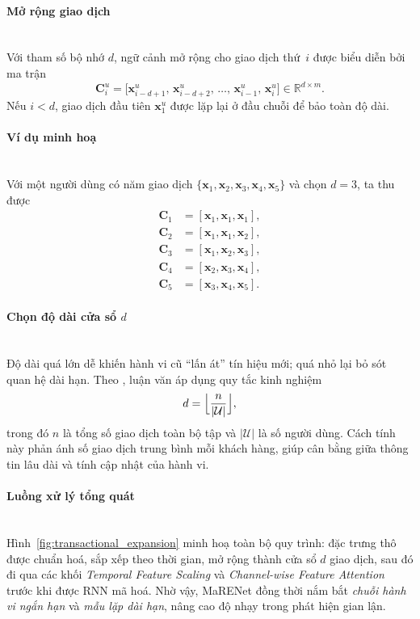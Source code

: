 \paragraph{Mở rộng giao dịch}
\mbox{}\\
Với tham số bộ nhớ $d$, ngữ cảnh mở rộng cho giao dịch thứ~$i$ được biểu diễn
bởi ma trận
\[
\mathbf{C}_i^u=\bigl[\mathbf{x}_{i-d+1}^u,\,
                      \mathbf{x}_{i-d+2}^u,\,
                      \dots,\,
                      \mathbf{x}_{i-1}^u,\,
                      \mathbf{x}_i^u\bigr]\in\mathbb{R}^{d\times m}.
\]
Nếu $i<d$, giao dịch đầu tiên $\mathbf{x}_1^u$ được lặp lại ở đầu chuỗi để bảo
toàn độ dài.

\paragraph{Ví dụ minh hoạ}
\mbox{}\\
Với một người dùng có năm giao dịch
$\{\mathbf{x}_1,\mathbf{x}_2,\mathbf{x}_3,\mathbf{x}_4,\mathbf{x}_5\}$ và chọn
$d=3$, ta thu được
\[
\begin{aligned}
\mathbf{C}_1&=[\mathbf{x}_1,\mathbf{x}_1,\mathbf{x}_1],\\
\mathbf{C}_2&=[\mathbf{x}_1,\mathbf{x}_1,\mathbf{x}_2],\\
\mathbf{C}_3&=[\mathbf{x}_1,\mathbf{x}_2,\mathbf{x}_3],\\
\mathbf{C}_4&=[\mathbf{x}_2,\mathbf{x}_3,\mathbf{x}_4],\\
\mathbf{C}_5&=[\mathbf{x}_3,\mathbf{x}_4,\mathbf{x}_5].
\end{aligned}
\]

\paragraph{Chọn độ dài cửa sổ $d$}
\mbox{}\\
Độ dài quá lớn dễ khiến hành vi cũ “lấn át” tín hiệu mới; quá nhỏ lại bỏ sót
quan hệ dài hạn. Theo \cite{Xie2022}, luận văn áp dụng quy tắc kinh nghiệm
\[
d=\Bigl\lfloor\frac{n}{|\mathcal{U}|}\Bigr\rfloor,
\]
trong đó $n$ là tổng số giao dịch toàn bộ tập và $|\mathcal{U}|$ là số người dùng.
Cách tính này phản ánh số giao dịch trung bình mỗi khách hàng, giúp cân bằng giữa
thông tin lâu dài và tính cập nhật của hành vi.

\paragraph{Luồng xử lý tổng quát}
\mbox{}\\
Hình~\ref{fig:transactional_expansion} minh hoạ toàn bộ quy trình: đặc trưng thô
được chuẩn hoá, sắp xếp theo thời gian, mở rộng thành cửa sổ $d$ giao dịch, sau đó
đi qua các khối \emph{Temporal Feature Scaling} và \emph{Channel-wise Feature
Attention} trước khi được RNN mã hoá. Nhờ vậy, MaRENet đồng thời nắm bắt
\emph{chuỗi hành vi ngắn hạn} và \emph{mẫu lặp dài hạn}, nâng cao độ nhạy trong
phát hiện gian lận.

